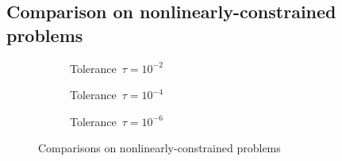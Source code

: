 



\subsection{Comparison on nonlinearly-constrained problems}

\begin{figure}[ht]
    \centering
    \begin{subfigure}[b]{0.49\textwidth}
        \centering
        \caption{Tolerance~$\tau = 10^{-2}$}
    \end{subfigure}
    \hfill
    \begin{subfigure}[b]{0.49\textwidth}
        \centering
        \caption{Tolerance~$\tau = 10^{-4}$}
    \end{subfigure}
    \begin{subfigure}[b]{0.49\textwidth}
        \centering
        \caption{Tolerance~$\tau = 10^{-6}$}
    \end{subfigure}
    \caption{Comparisons on nonlinearly-constrained problems}
\end{figure}

